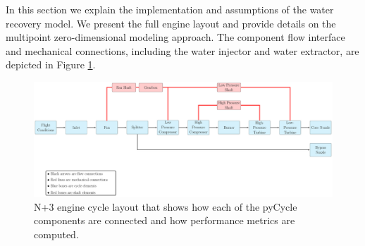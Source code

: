 \documentclass[conf]{new-aiaa}
\begin{document}
In this section we explain the implementation and assumptions of the water recovery model.
We present the full engine layout and provide details on the multipoint zero-dimensional modeling approach.
The component flow interface and mechanical connections, including the water injector and water extractor, are depicted in Figure \ref{fig:N3_original}.

\begin{figure}[hbt!]
    \centering
    \includegraphics[width=1.0\textwidth]{N3_cycle.pdf}
    \caption{
        N+3 engine cycle layout that shows how each of the pyCycle components are connected and how performance metrics are computed. %
    }
    \label{fig:N3_original}
\end{figure}
\end{document}
